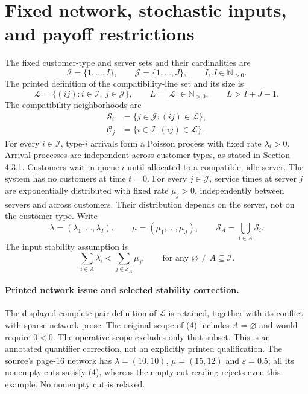 \documentclass{article}
\begin{document}
\section*{Fixed network, stochastic inputs, and payoff restrictions}

The fixed customer-type and server sets and their cardinalities are
\[
\mathcal I=\{1,\ldots,I\},\qquad
\mathcal J=\{1,\ldots,J\},\qquad I,J\in\mathbb N_{>0}.
\]
The printed definition of the compatibility-line set and its size is
\[
\mathcal L=\{(ij):i\in\mathcal I,\ j\in\mathcal J\},\qquad
L=|\mathcal L|\in\mathbb N_{>0},\qquad L>I+J-1.
\]
The compatibility neighborhoods are
\begin{align}
\mathcal S_i&=\{j\in\mathcal J:(ij)\in\mathcal L\},\tag{2}\\
\mathcal C_j&=\{i\in\mathcal I:(ij)\in\mathcal L\}.\tag{3}
\end{align}
For every $i\in\mathcal I$, type-$i$ arrivals form a Poisson process with fixed rate $\lambda_i>0$. Arrival processes are independent across customer types, as stated in Section 4.3.1. Customers wait in queue $i$ until allocated to a compatible, idle server. The system has no customers at time $t=0$. For every $j\in\mathcal J$, service times at server $j$ are exponentially distributed with fixed rate $\mu_j>0$, independently between servers and across customers. Their distribution depends on the server, not on the customer type. Write
\[
\lambda=(\lambda_1,\ldots,\lambda_I),\qquad
\mu=(\mu_1,\ldots,\mu_J),\qquad
\mathcal S_A=\bigcup_{i\in A}\mathcal S_i.
\]
The input stability assumption is
\begin{equation}
\sum_{i\in A}\lambda_i<\sum_{j\in\mathcal S_A}\mu_j,
\qquad\text{for any }\varnothing\ne A\subseteq\mathcal I.
\tag{4}
\end{equation}

\paragraph{Printed network issue and selected stability correction.}
The displayed complete-pair definition of $\mathcal L$ is retained, together
with its conflict with sparse-network prose. The original scope of (4) includes
$A=\varnothing$ and would require $0<0$. The operative scope excludes only that
subset. This is an annotated quantifier correction, not an explicitly printed
qualification. The source's page-16 network has $\lambda=(10,10)$,
$\mu=(15,12)$ and $\varepsilon=0.5$; all its nonempty cuts satisfy (4), whereas
the empty-cut reading rejects even this example. No nonempty cut is relaxed.
\end{document}
